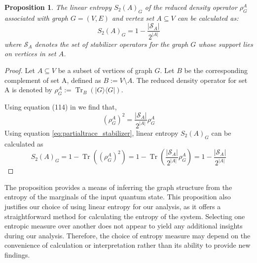 \documentclass{article}
\newtheorem{prop}[theorem]{Proposition}
\DeclareMathOperator{\Tr}{Tr}
\newcommand{\ket}[1]{|#1\rangle}
\newcommand{\bra}[1]{\langle #1|}
\begin{document}
\begin{prop} \label{prop:calculating_linear_entropy_using_stablizer_support}
    The linear entropy  $S_2(A)_G $ of the reduced density operator $\rho^A_G$ associated with graph $ G = (V, E) $ and vertex set $ A \subseteq V$ can be calculated as:
    \begin{equation} \label{eq:calculating_linear_entropy_using_stablizer_support}
     S_2(A)_G = 1 - \frac{|\mathcal{S}_A|}{2^{|A|}}
    \end{equation}
    where $\mathcal{S}_A$ denotes the set of stabilizer operators for the graph 
$G$ whose support lies on vertices in set $A$.
    
\end{prop}


\begin{proof}
     Let $A \subseteq V$ be a subset of vertices of graph $G$. Let $B$ be the corresponding complement of set A, defined as $B := V\setminus A$. The reduced density operator for set A is denoted by $\rho^A_G := \Tr_B(\ket{G}\bra{G})$. 
     
    Using equation (114) in \cite{hein2006entanglement} we find that,
    \begin{equation}
    \label{eq:partialtrace_stabilizer}
        (\rho^A_G)^2 = \frac{|\mathcal{S}_A|}{2^{|A|}} \rho^A_G
    \end{equation}
    Using equation \eqref{eq:partialtrace_stabilizer}, linear entropy $S_2(A)_{G}$ can be calculated as
    \begin{equation}
        S_2(A)_{G} = 1 - \Tr{((\rho^A_G)^2)} = 1 -  \Tr\left( \frac{|\mathcal{S}_A|}{2^{|A|}} \rho^A_G \right) =1 - \frac{|\mathcal{S}_A|}{2^{|A|}}
    \end{equation}
\end{proof}

The proposition provides a means of inferring the graph structure from the entropy of the marginals of the input quantum state. This proposition also justifies our choice of using linear entropy for our analysis, as it offers a straightforward method for calculating the entropy of the system. Selecting one entropic measure over another does not appear to yield any additional insights during our analysis. Therefore, the choice of entropy measure may depend on the convenience of calculation or interpretation rather than its ability to provide new findings.
\end{document}
